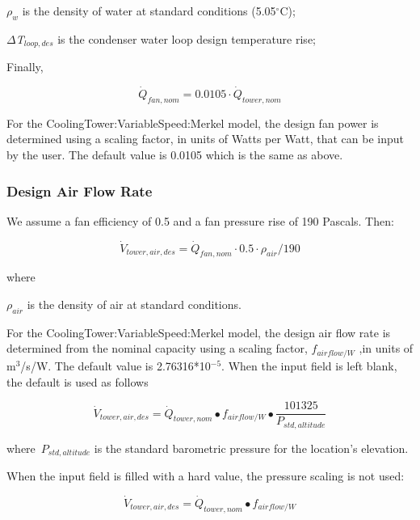 \emph{\(\rho_{w}\)} is the density of water at standard conditions (5.05\(^{\circ}\)C);

\emph{\(\Delta\)T\(_{loop,des}\)} is the condenser water loop design temperature rise;

Finally,

\begin{equation}
\dot Q_{fan,nom} = 0.0105\cdot \dot Q_{tower,nom}
\end{equation}

For the CoolingTower:VariableSpeed:Merkel model, the design fan power is determined using a scaling factor, in units of Watts per Watt, that can be input by the user. The default value is 0.0105 which is the same as above.

\subsubsection{Design Air Flow Rate}\label{design-air-flow-rate}

We assume a fan efficiency of 0.5 and a fan pressure rise of 190 Pascals. Then:

\begin{equation}
\dot V_{tower,air,des} = \dot Q_{fan,nom} \cdot 0.5 \cdot \rho_{air} / 190
\end{equation}

where

\(\rho_{air}\) is the density of air at standard conditions.

For the CoolingTower:VariableSpeed:Merkel model, the design air flow rate is determined from the nominal capacity using a scaling factor, \({f_{airflow/W}}\) ,in units of m\(^{3}\)/s/W. The default value is 2.76316*10\(^{-5}\). When the input field is left blank, the default is used as follows

\begin{equation}
{\dot V_{tower,air,des}} = {\dot Q_{tower,nom}} \bullet {f_{airflow/W}} \bullet \frac{{101325}}{{{P_{std,altitude}}}}
\end{equation}

where~\({P_{std,altitude}}\) is the standard barometric pressure for the location's elevation.

When the input field is filled with a hard value, the pressure scaling is not used:

\begin{equation}
{\dot V_{tower,air,des}} = {\dot Q_{tower,nom}} \bullet {f_{airflow/W}}
\end{equation}

